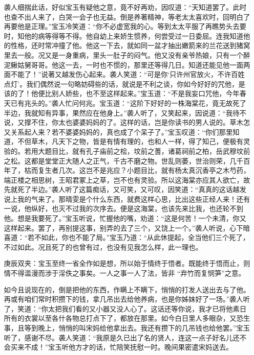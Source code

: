 \begin{parag}
    袭人细揣此话，好似宝玉有疑他之意，竟不好再劝，因叹道：“天知道罢了。此时也查不出人来了，白哭一会子也无益。倒是养著精神，等老太太喜欢时，回明白了再要他是正理。”宝玉冷笑道：“你不必虚宽我的心。等到太太平服了再瞧势头去要时，知他的病等得等不得。他自幼上来娇生惯养，何尝受过一日委屈。连我知道他的性格，还时常冲撞了他。他这一下去，就如同一盆才抽出嫩箭来的兰花送到猪窝里去一般。况又是一身重病，里头一肚子的闷气。他又没有亲爷热娘，只有一个醉泥鳅姑舅哥哥。他这一去，一时也不惯的，那里还等得几日。知道还能见他一面两面不能了！”说著又越发伤心起来。袭人笑道：“可是你‘只许州官放火，不许百姓点灯’。我们偶然说一句略妨碍些的话，就说是不利之谈，你如今好好的咒他，是该的了！他便比别人娇些，也不至这样起来。”宝玉道：“不是我妄口咒他，今年春天已有兆头的。”袭人忙问何兆。宝玉道：“这阶下好好的一株海棠花，竟无故死了半边，我就知有异事，果然应在他身上。”袭人听了，又笑起来，因说道：“我待不说，又撑不住，你太也婆婆妈妈的了。这样的话，岂是你读书的男人说的。草木怎又关系起人来？若不婆婆妈妈的，真也成了个呆子了。”宝玉叹道：“你们那里知道，不但草木，凡天下之物，皆是有情有理的，也和人一样，得了知己，便极有灵验的。若用大题目比，就有孔子庙前之桧，坟前之蓍，诸葛祠前之柏，岳武穆坟前之松。这都是堂堂正大随人之正气，千古不磨之物。世乱则萎，世治则荣，几千百年了，枯而复生者几次。这岂不是兆应？小题目比，就有杨太真沉香亭之木芍药，端正楼之相思树，王昭君冢上之草，岂不也有灵验。所以这海棠亦应其人欲亡，故先就死了半边。”袭人听了这篇痴话，又可笑，又可叹，因笑道：“真真的这话越发说上我的气来了。那晴雯是个什么东西，就费这样心思，比出这些正经人来！还有一说，他纵好，也灭不过我的次序去。便是这海棠，也该先来比我，也还轮不到他。想是我要死了。”宝玉听说，忙握他的嘴，劝道：“这是何苦！一个未清，你又这样起来。罢了，再别提这事，别弄的去了三个，又饶上一个。”袭人听说，心下暗喜道：“若不如此，你也不能了局。”宝玉乃道：“从此休提起，全当他们三个死了，不过如此。况且死了的也曾有过，也没有见我怎么样，此一理也。\begin{note}庚辰双夹：宝玉至终一省全作如是想，所以始于情终于悟者。既能终于悟而止，则情不得滥漫而涉于淫佚之事矣。一人之事一人了法，皆非 “弃竹而复悯笋”之意。\end{note}如今且说现在的，倒是把他的东西，作瞒上不瞒下，悄悄的打发人送出去与了他。再或有咱们常时积攒下的钱，拿几吊出去给他养病，也是你姊妹好了一场。”袭人听了，笑道：“你太把我们看的又小器又没人心了。这话还等你说，我才已将他素日所有的衣裳以至各什各物总打点下了，都放在那里。如今白日里人多眼杂，又恐生事，且等到晚上，悄悄的叫宋妈给他拿出去。我还有攒下的几吊钱也给他罢。”宝玉听了，感谢不尽。袭人笑道：“我原是久已出了名的贤人，连这一点子好名儿还不会买来不成！”宝玉听他方才的话，忙陪笑抚慰一时。晚间果密遣宋妈送去。
\end{parag}


